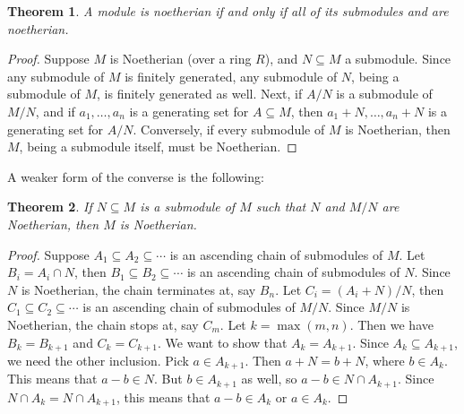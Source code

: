 \documentclass[12pt]{article}
\newtheorem{theorem}{Theorem}
\begin{document}
\begin{theorem}
A module is noetherian if and only if all of its submodules and 
 are noetherian.
\end{theorem}
\begin{proof}  Suppose $M$ is Noetherian (over a ring $R$), and $N\subseteq M$ a submodule.  Since any submodule of $M$ is finitely generated, any submodule of $N$, being a submodule of $M$, is finitely generated as well.  Next, if $A/N$ is a submodule of $M/N$, and if $a_1,\ldots, a_n$ is a generating set for $A\subseteq M$, then $a_1+N,\ldots,a_n+N$ is a generating set for $A/N$.  Conversely, if every submodule of $M$ is Noetherian, then $M$, being a submodule itself, must be Noetherian.
\end{proof}

A weaker form of the converse is the following:
\begin{theorem}
If $N\subseteq M$ is a submodule of $M$ such that $N$ and $M/N$ are Noetherian, then $M$ is Noetherian.
\end{theorem}
\begin{proof}  Suppose $A_1\subseteq A_2\subseteq \cdots $ is an ascending chain of submodules of $M$.  Let $B_i=A_i\cap N$, then $B_1\subseteq B_2\subseteq \cdots $ is an ascending chain of submodules of $N$.  Since $N$ is Noetherian, the chain terminates at, say $B_n$.  Let $C_i=(A_i+N)/N$, then $C_1\subseteq C_2\subseteq \cdots $ is an ascending chain of submodules of $M/N$.  Since $M/N$ is Noetherian, the chain stops at, say $C_m$.  Let $k=\max(m,n)$.  Then we have $B_k=B_{k+1}$ and $C_k=C_{k+1}$.  We want to show that $A_k=A_{k+1}$.  Since $A_k\subseteq A_{k+1}$, we need the other inclusion.  Pick $a\in A_{k+1}$.  Then $a+N=b+N$, where $b\in A_k$.  This means that $a-b\in N$.  But $b\in A_{k+1}$ as well, so $a-b\in N\cap A_{k+1}$.  Since $N\cap A_k =N\cap A_{k+1}$, this means that $a-b\in A_k$ or $a\in A_k$.
\end{proof}
\end{document}
